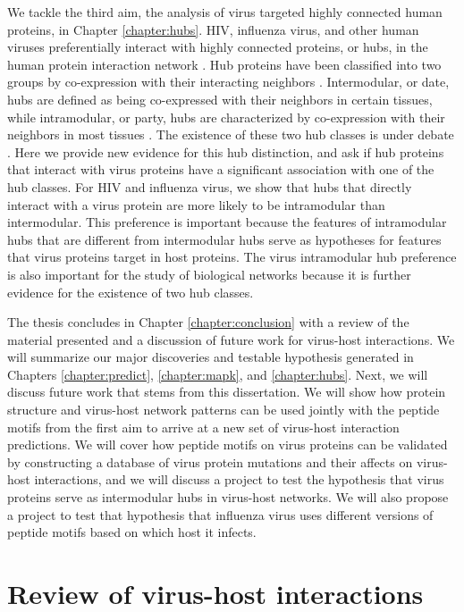 We tackle the third aim, the analysis of virus targeted highly
connected human proteins, in Chapter \ref{chapter:hubs}. HIV,
influenza virus, and other human viruses preferentially interact with
highly connected proteins, or hubs, in the human protein interaction
network \cite{calderwood07, dyer08, dechassey08, tastan09}. Hub
proteins have been classified into two groups by co-expression with
their interacting neighbors \cite{taylor09}. Intermodular, or date,
hubs are defined as being co-expressed with their neighbors in certain
tissues, while intramodular, or party, hubs are characterized by
co-expression with their neighbors in most tissues
\cite{taylor09}. The existence of these two hub classes is under
debate \cite{taylor09,batada06,batada07,agarwal09,han04}. Here we
provide new evidence for this hub distinction, and ask if hub proteins
that interact with virus proteins have a significant association with
one of the hub classes. For HIV and influenza virus, we show that hubs
that directly interact with a virus protein are more likely to be
intramodular than intermodular. This preference is important because
the features of intramodular hubs that are different from intermodular
hubs serve as hypotheses for features that virus proteins target in
host proteins. The virus intramodular hub preference is also important
for the study of biological networks because it is further evidence
for the existence of two hub classes.

The thesis concludes in Chapter \ref{chapter:conclusion} with a review
of the material presented and a discussion of future work for
virus-host interactions. We will summarize our major discoveries and
testable hypothesis generated in Chapters \ref{chapter:predict},
\ref{chapter:mapk}, and \ref{chapter:hubs}. Next, we will discuss
future work that stems from this dissertation. We will show how
protein structure and virus-host network patterns can be used jointly
with the peptide motifs from the first aim to arrive at a new set of
virus-host interaction predictions. We will cover how peptide motifs
on virus proteins can be validated by constructing a database of virus
protein mutations and their affects on virus-host interactions, and we
will discuss a project to test the hypothesis that virus proteins
serve as intermodular hubs in virus-host networks. We will also
propose a project to test that hypothesis that influenza virus uses
different versions of peptide motifs based on which host it infects.

\section{Review of virus-host interactions}

